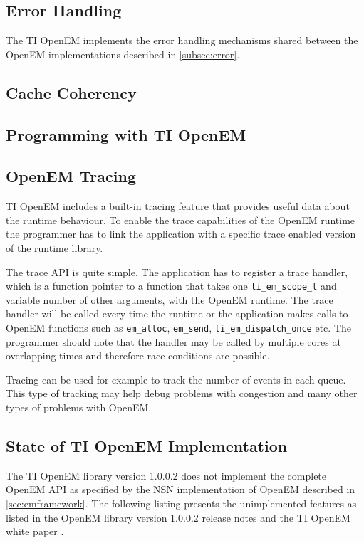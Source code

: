 \subsection{Error Handling}
The TI OpenEM implements the error handling mechanisms shared between the OpenEM implementations described in \ref{subsec:error}. 

\subsection{Cache Coherency}

\subsection{Programming with TI OpenEM}
\label{subsec:ti_init_layer}

\subsection{OpenEM Tracing}
TI OpenEM includes a built-in tracing feature that provides useful data about the runtime behaviour. To enable the trace capabilities of the OpenEM runtime the programmer has to link the application with a specific trace enabled version of the runtime library. \cite{openemapi}

The trace API is quite simple. The application has to register a trace handler, which is a function pointer to a function that takes one \texttt{ti\_em\_scope\_t} and variable number of other arguments, with the OpenEM runtime. The trace handler will be called every time the runtime or the application makes calls to OpenEM functions such as \texttt{em\_alloc}, \texttt{em\_send}, \texttt{ti\_em\_dispatch\_once} etc. \cite{openemapi} The programmer should note that the handler may be called by multiple cores at overlapping times and therefore race conditions are possible.

Tracing can be used for example to track the number of events in each queue. This type of tracking may help debug problems with congestion and many other types of problems with OpenEM.

\subsection{State of TI OpenEM Implementation}
The TI OpenEM library version 1.0.0.2 does not implement the complete OpenEM API as specified by the NSN implementation of OpenEM described in \ref{sec:emframework}. The following listing presents the unimplemented features as listed in the OpenEM library version 1.0.0.2 release notes \cite{openemnotes} and the TI OpenEM white paper \cite{openemwhite}.

